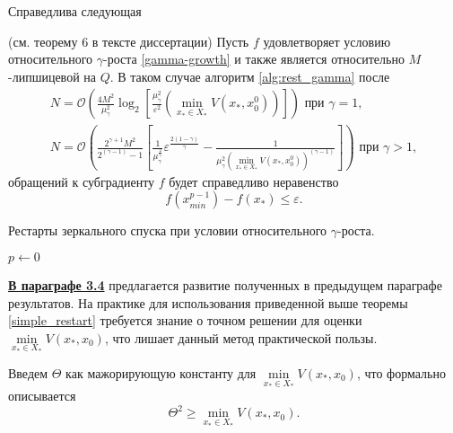 Справедлива следующая 
\begin{theorem} \label{simple_restart} (см. теорему 6 в тексте диссертации)
    Пусть $f$ удовлетворяет условию относительного $\gamma$-роста \eqref{gamma-growth} и также является относительно $M$-липшицевой на $Q$. В таком случае алгоритм \ref{alg:rest_gamma} после 
    \begin{equation}
    \begin{aligned}
       N =\mathcal{O}\left(\frac{4 M^2}{\mu_{\gamma}^2} \log_2{\left[\frac{\mu_{\gamma}^2}{\varepsilon^2} \left(\min\limits_{x_* \in X_*}{V(x_*, x_0^0)}\right) \right]}\right) \text{ при } \gamma = 1, \\
       N = \mathcal{O}\left(\frac{2^{\gamma + 1} M^2}{2^{(\gamma - 1)} - 1}\left[\frac{1}{\mu_{\gamma}^{\frac{2}{\gamma}}} \varepsilon^{\frac{2(1 - \gamma)}{\gamma}}  - \frac{1}{\mu_{\gamma}^2 \left(\min\limits_{x_* \in X_*}{V(x_*, x_0^0)}\right)^{(\gamma - 1)}} \right]\right) \text{ при } \gamma > 1,
    \end{aligned}
    \end{equation}
    обращений к субградиенту $f$ будет справедливо неравенство
    \begin{equation}
        f(x_{min}^{p-1}) - f(x_*) \leq \varepsilon.
    \end{equation}
\end{theorem}

\begin{algorithm}[htp]
    \caption{Рестарты зеркального спуска при условии относительного $\gamma$-роста.}
    \label{alg:rest_gamma}
    $p \gets 0$\;
\end{algorithm}


\underline{\textbf{В параграфе 3.4}} предлагается развитие полученных в предыдущем параграфе результатов. На практике для использования приведенной выше теоремы \ref{simple_restart} требуется знание о точном решении для оценки $\min\limits_{x_* \in X_*}{V(x_*, x_0)}$, что лишает данный метод практической пользы. 

Введем $\Theta$ как мажорирующую константу для $\min\limits_{x_* \in X_*}{V(x_*, x_0)}$, что формально описывается
$$
    \Theta^2 \geq \min\limits_{x_* \in X_*}{V(x_*, x_0)}.
$$

